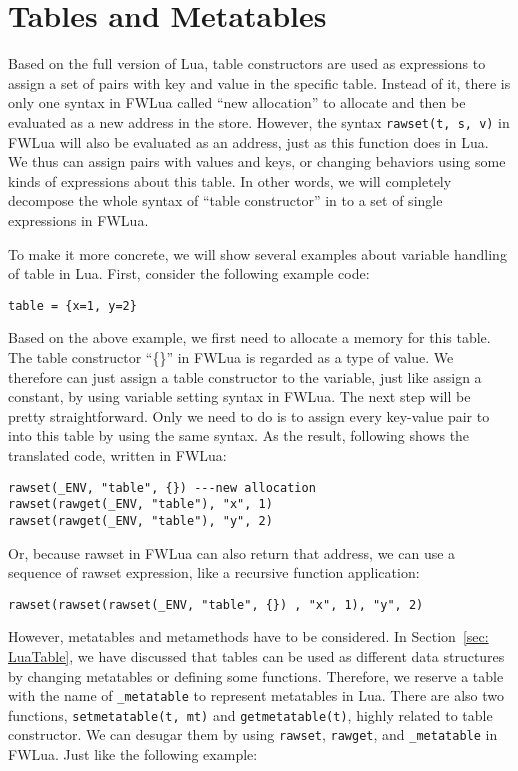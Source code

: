 \section{Tables and Metatables}\label{sec:TranslateTabls}
Based on the full version of Lua, table constructors are used as expressions to assign a set of pairs with key and value in the specific table. Instead of it, there is only one syntax in FWLua called ``new allocation'' to allocate and then be evaluated as a new address in the store. 
However, the syntax {\tt rawset(t, s, v)} in FWLua will also be evaluated as an address, just as this function does in Lua. We thus can assign pairs with values and keys, or changing behaviors using some kinds of expressions about this table. In other words, we will completely decompose the whole syntax of ``table constructor'' in to a set of single expressions in FWLua. 

To make it more concrete, we will show several examples about variable handling of table in Lua. First, consider the following example code:

\begin{verbatim}
table = {x=1, y=2}
\end{verbatim}

Based on the above example, we first need to allocate a memory for this table. The table constructor ``\{\}'' in FWLua is regarded as a type of value. We therefore can just assign a table constructor to the variable, just like assign a constant, by using variable setting syntax in FWLua. The next step will be pretty straightforward. Only we need to do is to assign every key-value pair to into this table by using the same syntax. As the result, following shows the translated code, written in FWLua:

\begin{verbatim}
rawset(_ENV, "table", {}) ---new allocation
rawset(rawget(_ENV, "table"), "x", 1)
rawset(rawget(_ENV, "table"), "y", 2)
\end{verbatim}

Or, because rawset in FWLua can also return that address, we can use a sequence of rawset expression, like a recursive function application:

\begin{verbatim}
rawset(rawset(rawset(_ENV, "table", {}) , "x", 1), "y", 2)
\end{verbatim}

However, metatables and metamethods have to be considered. In Section~\ref{sec: LuaTable}, we have discussed that tables can be used as different data structures by changing metatables or defining some functions. Therefore, we reserve a table with the name of {\tt \_metatable} to represent metatables in Lua. There are also two functions, {\tt setmetatable(t, mt)} and {\tt getmetatable(t)}, highly related to table constructor. We can desugar them by using {\tt rawset}, {\tt rawget}, and {\tt \_metatable} in FWLua. Just like the following example:

